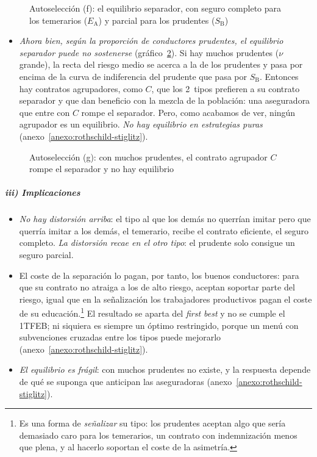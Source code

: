 \documentclass[11pt]{article}
\begin{document}
\begin{figure}[H]
\centering
\caption{Autoselección (f): el equilibrio separador, con seguro completo para los temerarios ($E_{\mathrm{A}}$) y parcial para los prudentes ($S_{\mathrm{B}}$)}\label{fig:rothschild-stiglitz}
\end{figure}

\begin{itemize}
\item \emph{Ahora bien, según la proporción de conductores prudentes, el equilibrio separador puede no sostenerse} (gráfico~\ref{fig:rs-inexistencia}). Si hay muchos prudentes ($\nu$ grande), la recta del riesgo medio se acerca a la de los prudentes y pasa por encima de la curva de indiferencia del prudente que pasa por $S_{\mathrm{B}}$. Entonces hay contratos agrupadores, como $C$, que los 2~tipos prefieren a su contrato separador y que dan beneficio con la mezcla de la población: una aseguradora que entre con $C$ rompe el separador. Pero, como acabamos de ver, ningún agrupador es un equilibrio. \emph{No hay equilibrio en estrategias puras} (anexo~\ref{anexo:rothschild-stiglitz}).
\end{itemize}

\begin{figure}[H]
\centering
\caption{Autoselección (g): con muchos prudentes, el contrato agrupador $C$ rompe el separador y no hay equilibrio}\label{fig:rs-inexistencia}
\end{figure}

\subparagraph{iii) Implicaciones}

\begin{itemize}
\item \emph{No hay distorsión arriba}: el tipo al que los demás no querrían imitar pero que querría imitar a los demás, el temerario, recibe el contrato eficiente, el seguro completo. \emph{La distorsión recae en el otro tipo}: el prudente solo consigue un seguro parcial.
\item El coste de la separación lo pagan, por tanto, los buenos conductores: para que su contrato no atraiga a los de alto riesgo, aceptan soportar parte del riesgo, igual que en la señalización los trabajadores productivos pagan el coste de su educación.\footnote{Es una forma de \emph{señalizar} su tipo: los prudentes aceptan algo que sería demasiado caro para los temerarios, un contrato con indemnización menos que plena, y al hacerlo soportan el coste de la asimetría.} El resultado se aparta del \emph{first best} y no se cumple el 1TFEB; ni siquiera es siempre un óptimo restringido, porque un menú con subvenciones cruzadas entre los tipos puede mejorarlo (anexo~\ref{anexo:rothschild-stiglitz}).
\item \emph{El equilibrio es frágil}: con muchos prudentes no existe, y la respuesta depende de qué se suponga que anticipan las aseguradoras (anexo~\ref{anexo:rothschild-stiglitz}).
\end{itemize}
\end{document}
